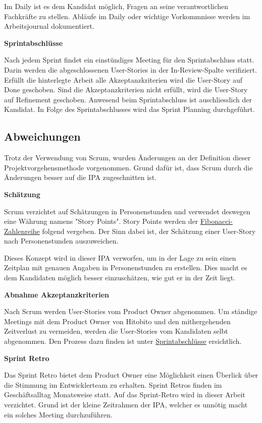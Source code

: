 Im Daily ist es dem Kandidat möglich, Fragen an seine verantwortlichen Fachkräfte zu stellen. Abläufe im Daily oder wichtige 
Vorkommnisse werden im Arbeitsjournal dokumentiert.

\textbf{Sprintabschlüsse}
\label{sprintfinish}

Nach jedem Sprint findet ein einstündiges Meeting für den Sprintabschluss statt. Darin werden die abgeschlossenen User-Stories
in der In-Review-Spalte verifiziert. Erfüllt die hinterlegte Arbeit alle Akzeptanzkriterien wird die User-Story auf Done geschoben. 
Sind die Akzeptanzkriterien nicht erfüllt, wird die User-Story auf Refinement geschoben. Anwesend beim Sprintabschluss ist auschliesslich der Kandidat.
In Folge des Sprintabschlusses wird das Sprint Planning durchgeführt.

\subsection{Abweichungen}
Trotz der Verwendung von Scrum, wurden Änderungen an der Definition dieser Projektvorgehensmethode
vorgenommen. Grund dafür ist, dass Scrum durch die Änderungen besser auf die IPA zugeschnitten ist.

\textbf{Schätzung}

Scrum verzichtet auf Schätzungen in Personenstunden und verwendet deswegen eine Währung namens "Story Points". Story Points werden
der \href{https://de.wikipedia.org/wiki/Fibonacci-Folge}{Fibonacci-Zahlenreihe} folgend vergeben. Der Sinn dabei ist, der Schätzung einer User-Story 
nach Personenstunden auszuweichen.

Dieses Konzept wird in dieser IPA verworfen, um in der Lage zu sein einen Zeitplan mit genauen Angaben in Personenstunden zu erstellen. Dies macht es dem Kandidaten
möglich besser einzuschätzen, wie gut er in der Zeit liegt.

\textbf{Abnahme Akzeptanzkriterien}

Nach Scrum werden User-Stories vom Product Owner abgenommen. Um ständige Meetings mit dem Product Owner von
Hitobito und den mithergehenden Zeitverlust zu vermeiden, werden die User-Stories vom Kandidaten selbt abgenommen. Den Prozess dazu
finden ist unter \hyperref[sec:sprintfinish]{Sprintabschlüsse} ersichtlich.

\newpage

\textbf{Sprint Retro}

Das Sprint Retro bietet dem Product Owner eine Möglichkeit einen Überlick über die Stimmung im Entwicklerteam zu erhalten. Sprint Retros finden 
im Geschäftsalltag Monatsweise statt. Auf das Sprint-Retro wird
in dieser Arbeit verzichtet. Grund ist der kleine Zeitrahmen der IPA, welcher es unnötig macht ein solches Meeting durchzuführen.

